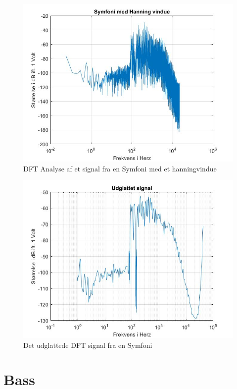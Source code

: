 \begin{figure}[ht!]
	\centering
	\includegraphics[width=180mm]{figures/Symfoni/hanning.jpg}
	\caption{DFT Analyse af et signal fra en Symfoni med et hanningvindue}
	\label{fig:Symfoni hanning}
\end{figure}

\begin{figure}[ht!]
	\centering
	\includegraphics[width=180mm]{figures/Symfoni/udglattet.jpg}
	\caption{Det udglattede DFT signal fra en Symfoni}
	\label{fig:Symfoni udglattet}
\end{figure}

\section{Bass}

